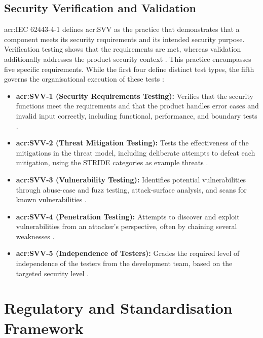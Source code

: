 \subsection{Security Verification and Validation}
\label{subsec:svv}

\gls{acr:IEC} 62443-4-1 defines \gls{acr:SVV} as the practice that demonstrates that a component meets its security requirements and its intended security purpose. Verification testing shows that the requirements are met, whereas validation additionally addresses the product security context \cite[p. 16]{DIN_EN_IEC_62443_4_1_2018}. This practice encompasses five specific requirements. While the first four define distinct test types, the fifth governs the organisational execution of these tests \cite[pp. 37]{DIN_EN_IEC_62443_4_1_2018}:
\begin{itemize}
	\item \textbf{\gls{acr:SVV}-1 (Security Requirements Testing):} Verifies that the security functions meet the requirements and that the product handles error cases and invalid input correctly, including functional, performance, and boundary tests \cite[p. 38]{DIN_EN_IEC_62443_4_1_2018}.
	\item \textbf{\gls{acr:SVV}-2 (Threat Mitigation Testing):} Tests the effectiveness of the mitigations in the threat model, including deliberate attempts to defeat each mitigation, using the STRIDE categories as example threats \cite[pp. 38]{DIN_EN_IEC_62443_4_1_2018}.
	\item \textbf{\gls{acr:SVV}-3 (Vulnerability Testing):} Identifies potential vulnerabilities through abuse-case and fuzz testing, attack-surface analysis, and scans for known vulnerabilities \cite[p. 39]{DIN_EN_IEC_62443_4_1_2018}.
	\item \textbf{\gls{acr:SVV}-4 (Penetration Testing):} Attempts to discover and exploit vulnerabilities from an attacker's perspective, often by chaining several weaknesses \cite[pp. 39]{DIN_EN_IEC_62443_4_1_2018}.
	\item \textbf{\gls{acr:SVV}-5 (Independence of Testers):} Grades the required level of independence of the testers from the development team, based on the targeted security level \cite[pp. 40]{DIN_EN_IEC_62443_4_1_2018}.
\end{itemize}


\section{Regulatory and Standardisation Framework} 
\label{sec:regulatory_framework} 

